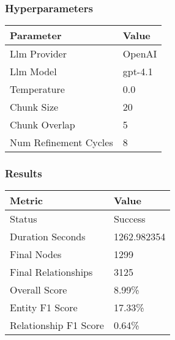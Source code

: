 \subsubsection{Hyperparameters}
\begin{tabular}{ll}
\toprule
\textbf{Parameter} & \textbf{Value} \\
\midrule
Llm Provider & OpenAI \\
Llm Model & gpt-4.1 \\
Temperature & 0.0 \\
Chunk Size & 20 \\
Chunk Overlap & 5 \\
Num Refinement Cycles & 8 \\
\bottomrule
\end{tabular}

\subsubsection{Results}
\begin{tabular}{ll}
\toprule
\textbf{Metric} & \textbf{Value} \\
\midrule
Status & Success \\
Duration Seconds & 1262.982354 \\
Final Nodes & 1299 \\
Final Relationships & 3125 \\
Overall Score & 8.99\% \\
Entity F1 Score & 17.33\% \\
Relationship F1 Score & 0.64\% \\
\bottomrule
\end{tabular}
